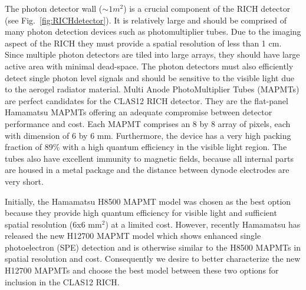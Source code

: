 The photon detector wall ($\sim 1 m^2$) is a crucial component of the RICH detector (see Fig.~\ref{fig:RICHdetector}). It is relatively large and should be comprised of many photon detection devices such as photomultiplier tubes.
Due to the imaging aspect of the RICH they must provide a spatial resolution of less than 1 cm.
Since multiple photon detectors are tiled into large arrays, they should have large active area with minimal dead-space.
The photon detectors must also efficiently detect single photon level signals and should be sensitive to the visible light due to the aerogel radiator material.
Multi Anode PhotoMultiplier Tubes (MAPMTs) are perfect candidates for the CLAS12 RICH detector.
They are the flat-panel Hamamatsu MAPMTs offering an adequate compromise between detector performance and cost.
Each MAPMT comprises an 8 by 8 array of pixels, each with dimension of 6 by 6 mm.
Furthermore, the device has a very high packing fraction of 89\% with a high quantum efficiency in the visible light region.
The tubes also have excellent immunity to magnetic fields, because all internal parts are housed in a metal package and the distance between dynode electrodes are very short.


Initially, the Hamamatsu H8500 MAPMT model \cite{H8500} was chosen as the best option because they provide high quantum efficiency for visible light and sufficient spatial resolution (6x6 mm$^2$) at a limited cost.  However, recently Hamamatsu has released the new H12700 MAPMT model which shows enhanced single photoelectron (SPE) detection and is otherwise similar to the H8500 MAPMTs in spatial resolution and  cost.  Consequently we desire to better characterize the new H12700 MAPMTs \cite{H12700} and choose the best model between these two options for inclusion in the CLAS12 RICH.

